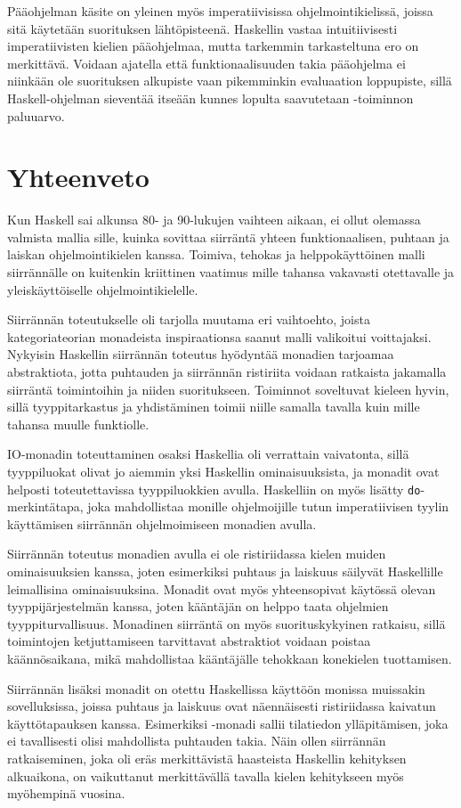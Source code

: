 \documentclass[finnish]{tktltiki2}
\begin{document}
Pääohjelman käsite on yleinen myös imperatiivisissa ohjelmointikielissä, joissa sitä käytetään
suorituksen lähtöpisteenä. Haskellin  vastaa intuitiivisesti imperatiivisten kielien
pääohjelmaa, mutta tarkemmin tarkasteltuna ero on merkittävä. Voidaan ajatella että
funktionaalisuuden takia pääohjelma ei niinkään ole suorituksen alkupiste vaan pikemminkin
evaluaation loppupiste, sillä Haskell-ohjelman sieventää itseään kunnes lopulta saavutetaan
-toiminnon paluuarvo.


\section{Yhteenveto}

Kun Haskell sai alkunsa 80- ja 90-lukujen vaihteen aikaan, ei ollut olemassa valmista mallia sille,
kuinka sovittaa siirräntä yhteen funktionaalisen, puhtaan ja laiskan ohjelmointikielen kanssa.
Toimiva, tehokas ja helppokäyttöinen malli siirrännälle on kuitenkin kriittinen vaatimus mille
tahansa vakavasti otettavalle ja yleiskäyttöiselle ohjelmointikielelle.

Siirrännän toteutukselle oli tarjolla muutama eri vaihtoehto, joista kategoriateorian monadeista
inspiraationsa saanut malli valikoitui voittajaksi. Nykyisin Haskellin siirrännän toteutus hyödyntää
monadien tarjoamaa abstraktiota, jotta puhtauden ja siirrännän ristiriita voidaan ratkaista
jakamalla siirräntä toimintoihin ja niiden suoritukseen. Toiminnot soveltuvat kieleen hyvin, sillä
tyyppitarkastus ja yhdistäminen toimii niille samalla tavalla kuin mille tahansa muulle funktiolle.

IO-monadin toteuttaminen osaksi Haskellia oli verrattain vaivatonta, sillä tyyppiluokat olivat jo
aiemmin yksi Haskellin ominaisuuksista, ja monadit ovat helposti toteutettavissa tyyppiluokkien
avulla. Haskelliin on myös lisätty \verb|do|-merkintätapa, joka mahdollistaa monille ohjelmoijille
tutun imperatiivisen tyylin käyttämisen siirrännän ohjelmoimiseen monadien avulla.

Siirrännän toteutus monadien avulla ei ole ristiriidassa kielen muiden ominaisuuksien kanssa, joten
esimerkiksi puhtaus ja laiskuus säilyvät Haskellille leimallisina ominaisuuksina. Monadit ovat myös
yhteensopivat käytössä olevan tyyppijärjestelmän kanssa, joten kääntäjän on helppo taata ohjelmien
tyyppiturvallisuus. Monadinen siirräntä on myös suorituskykyinen ratkaisu, sillä toimintojen
ketjuttamiseen tarvittavat abstraktiot voidaan poistaa käännösaikana, mikä mahdollistaa kääntäjälle
tehokkaan konekielen tuottamisen.

Siirrännän lisäksi monadit on otettu Haskellissa käyttöön monissa muissakin sovelluksissa, joissa
puhtaus ja laiskuus ovat näennäisesti ristiriidassa kaivatun käyttötapauksen kanssa. Esimerkiksi
-monadi sallii tilatiedon ylläpitämisen, joka ei tavallisesti olisi mahdollista
puhtauden takia. Näin ollen siirrännän ratkaiseminen, joka oli eräs merkittävistä haasteista
Haskellin kehityksen alkuaikona, on vaikuttanut merkittävällä tavalla kielen kehitykseen myös
myöhempinä vuosina.



\end{document}
